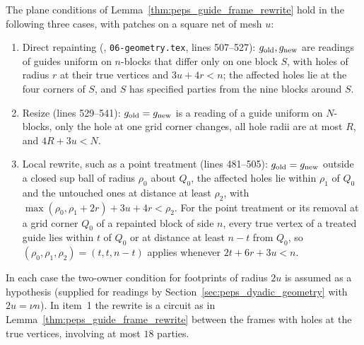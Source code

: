 \begin{lemma}
    \label{thm:peps_guide_frame_rewrite_events}
    \leanok
    The plane conditions of Lemma~\ref{thm:peps_guide_frame_rewrite} hold in
    the following three cases, with patches on a square net of mesh $u$:
    \begin{enumerate}
        \item Direct repainting (\cite[Section~7]{OpenAI2026PolynomialPEPS},
              \texttt{06-geometry.tex}, lines 507--527): $g_{\rm old},g_{\rm new}$ are
              readings of guides uniform on $n$-blocks that differ only on
              one block $S$, with holes of radius $r$ at their true vertices and
              $3u+4r<n$; the affected holes lie at the four corners of $S$, and $S$ has specified parties from the nine blocks around $S$.
        \item Resize (lines 529--541): $g_{\rm old}=g_{\rm new}$ is a reading of a guide
              uniform on $N$-blocks, only the hole at one grid corner
              changes, all hole radii are at most $R$, and $4R+3u<N$.
        \item Local rewrite, such as a point treatment (lines 481--505):
              $g_{\rm old}=g_{\rm new}$ outside a closed sup ball of radius $\rho_0$ about $Q_0$, the affected
              holes lie within $\rho_1$ of $Q_0$ and the untouched ones at
              distance at least $\rho_2$, with
              $\max(\rho_0,\rho_1+2r)+3u+4r<\rho_2$. For the point treatment or its removal at
              a grid corner $Q_0$ of a repainted block of side $n$, every true vertex of
              a treated guide lies within $t$ of $Q_0$ or at distance at least $n-t$
              from $Q_0$, so $(\rho_0,\rho_1,\rho_2)=(t,t,n-t)$ applies whenever
              $2t+6r+3u<n$.
    \end{enumerate}
    In each case the two-owner condition for footprints of
    radius $2u$ is assumed as a hypothesis (supplied for readings by Section~\ref{sec:peps_dyadic_geometry} with $2u=\nu n$). In item~1 the rewrite is a circuit as in
    Lemma~\ref{thm:peps_guide_frame_rewrite} between the frames with holes at
    the true vertices, involving at most $18$ parties.
\end{lemma}

